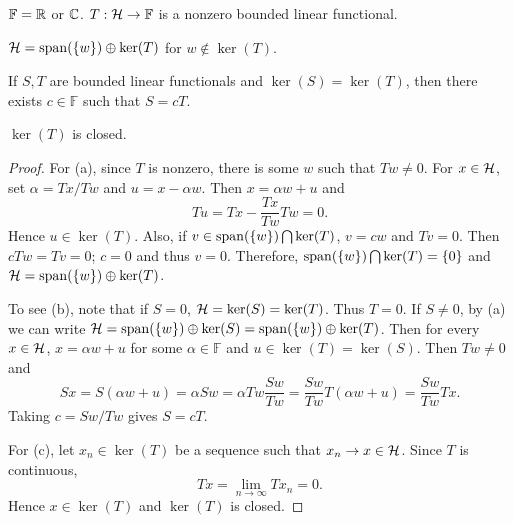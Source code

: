 \begin{proposition}
    $\mathbb{F} = \mathbb{R}$ or $\mathbb{C}$. $T:\mathcal{H}\to\mathbb{F}$ is a nonzero bounded 
    linear functional. 
    \begin{thmenum}
        \item $\mathcal{H} = \operatorname{span}(\left\{ {w} \right\})\oplus\ker(T)$ for $w\notin \ker(T)$.
        \item If $S,T$ are bounded linear functionals and $\ker(S) = \ker(T)$, 
        then there exists $c\in\mathbb{F}$ such that $S = cT$. 
        \item $\ker(T)$ is closed.
    \end{thmenum}
\end{proposition}
\begin{proof}
    For (a), since $T$ is nonzero, there is some $w$ such that $Tw\neq 0$. 
    For $x\in\mathcal{H}$, set $\alpha = Tx/Tw$ and $u = x - \alpha w$. Then 
    $x = \alpha w + u$ and 
    \begin{equation*}
        Tu = Tx - \frac{Tx}{Tw}Tw = 0.
    \end{equation*}
    Hence $u\in \ker(T)$. Also, if $v\in \operatorname{span}(\left\{ {w} \right\})\bigcap\ker(T)$, 
    $v = cw$ and $Tv = 0$. Then $cTw = Tv = 0$; $c = 0$ and thus $v = 0$. 
    Therefore, $\operatorname{span}(\left\{ {w} \right\})\bigcap\ker(T) = \left\{ {0} \right\}$ and 
    $\mathcal{H} = \operatorname{span}(\left\{ {w} \right\})\oplus\ker(T)$. 

    To see (b), note that if $S = 0$, $\mathcal{H} = \ker(S) = \ker(T)$. 
    Thus $T = 0$. If $S\neq 0$, by (a) we can write 
    $\mathcal{H} = \operatorname{span}(\left\{ {w} \right\})\oplus\ker(S) = \operatorname{span}(\left\{ {w} \right\})\oplus\ker(T)$. 
    Then for every $x\in\mathcal{H}$, $x = \alpha w + u$ for some $\alpha\in\mathbb{F}$ 
    and $u\in\ker(T)=\ker(S)$. Then $Tw\neq 0$ and
    \begin{equation*}
        Sx = S(\alpha w + u) = \alpha Sw = \alpha Tw\frac{Sw}{Tw} = \frac{Sw}{Tw}T(\alpha w + u) = \frac{Sw}{Tw}Tx.
    \end{equation*}
    Taking $c = Sw/Tw$ gives $S = cT$. 

    For (c), let $x_n\in\ker(T)$ be a sequence such that $x_n\to x\in\mathcal{H}$. 
    Since $T$ is continuous, 
    \begin{equation*}
        Tx = \lim_{n\to\infty} Tx_n = 0. 
    \end{equation*}
    Hence $x\in\ker(T)$ and $\ker(T)$ is closed.
\end{proof}